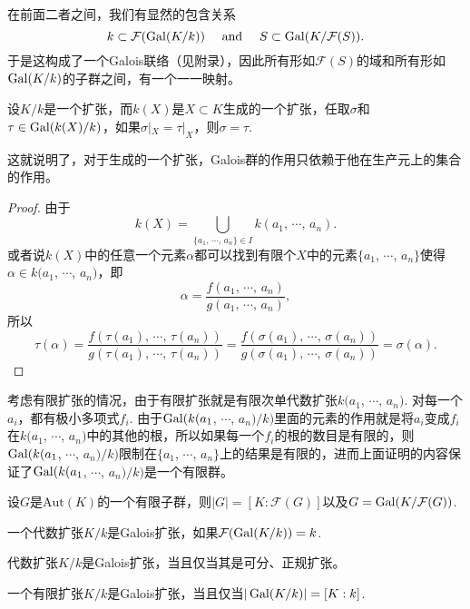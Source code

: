 在前面二者之间，我们有显然的包含关系
\[
    k\subset \mathcal{F}(\operatorname{Gal}(K/k))\quad \text{ and }\quad S\subset \operatorname{Gal}(K/\mathcal{F}(S)).
\]
于是这构成了一个Galois联络（见附录），因此所有形如$\mathcal{F}(S)$的域和所有形如$\operatorname{Gal}(K/k)$的子群之间，有一个一一映射。

\begin{lem}
    设$K/k$是一个扩张，而$k(X)$是$X\subset K$生成的一个扩张，任取$\sigma$和$\tau\in \operatorname{Gal}(k(X)/k)$，如果$\sigma|_X=\tau|_X$，则$\sigma=\tau$.
\end{lem}

这就说明了，对于生成的一个扩张，Galois群的作用只依赖于他在生产元上的集合的作用。

\begin{proof}
    由于\[
        k(X)=\bigcup_{\{a_1\text{, $\cdots$, }a_n\}\in I} k(a_1\text{, $\cdots$, }a_n).
    \]
    或者说$k(X)$中的任意一个元素$\alpha$都可以找到有限个$X$中的元素$\{a_1$, $\cdots$, $a_n\}$使得$\alpha\in k(a_1$, $\cdots$, $a_n)$，即
    \[
        \alpha=\frac{f(a_1\text{, $\cdots$, }a_n)}{g(a_1\text{, $\cdots$, }a_n)},
    \]
    所以
    \[
        \tau(\alpha)=\frac{f(\tau(a_1)\text{, $\cdots$, }\tau(a_n))}{g(\tau(a_1)\text{, $\cdots$, }\tau(a_n))}=\frac{f(\sigma(a_1)\text{, $\cdots$, }\sigma(a_n))}{g(\sigma(a_1)\text{, $\cdots$, }\sigma(a_n))}=\sigma(\alpha).
    \]
\end{proof}

考虑有限扩张的情况，由于有限扩张就是有限次单代数扩张$k(a_1$, $\cdots$, $a_n)$. 对每一个$a_i$，都有极小多项式$f_i$. 由于$\operatorname{Gal}(k(a_1$, $\cdots$, $a_n)/k)$里面的元素的作用就是将$a_i$变成$f_i$在$k(a_1$, $\cdots$, $a_n)$中的其他的根，所以如果每一个$f_i$的根的数目是有限的，则$\operatorname{Gal}(k(a_1$, $\cdots$, $a_n)/k)$限制在$\{a_1$, $\cdots$, $a_n\}$上的结果是有限的，进而上面证明的内容保证了$\operatorname{Gal}(k(a_1$, $\cdots$, $a_n)/k)$是一个有限群。

\begin{pro}
    设$G$是$\mathrm{Aut}(K)$的一个有限子群，则$|G|=[K:\mathcal{F}(G)]$以及$G=\operatorname{Gal}(K/\mathcal{F}(G))$.
\end{pro}

\para[Galois扩张] 一个代数扩张$K/k$是Galois扩张，如果$\mathcal{F}(\operatorname{Gal}(K/k))=k$.
\endpara

\begin{pro}
    代数扩张$K/k$是Galois扩张，当且仅当其是可分、正规扩张。
\end{pro}

\begin{pro}
    一个有限扩张$K/k$是Galois扩张，当且仅当$|\operatorname{Gal}(K/k)|=[K:k]$.
\end{pro}

